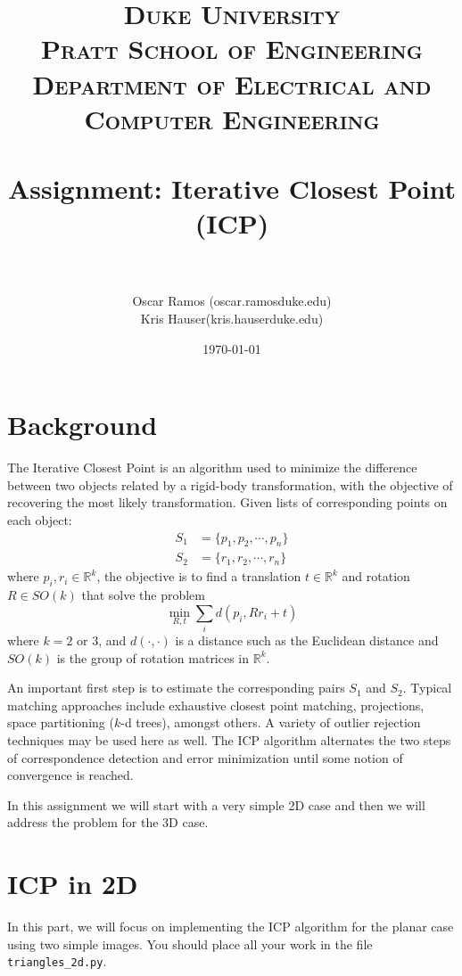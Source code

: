 \documentclass[a4paper,11pt]{article}
\title{	
  \normalfont \normalsize 
  \textsc{
    Duke University \\ 
    Pratt School of Engineering \\
    Department of Electrical and Computer Engineering} \\ [25pt]
  \horrule{0.5pt} \\[0.4cm]
  \huge Assignment: Iterative Closest Point (ICP) \\
  \horrule{2pt} \\[0.5cm]  
}
\author{Oscar Ramos (oscar.ramos\@ duke.edu)\\
Kris Hauser(kris.hauser\@ duke.edu) }
\date{\normalsize\today}
\begin{document}
\maketitle
\thispagestyle{empty}



\section{Background}

The Iterative Closest Point is an algorithm used to minimize the difference
between two objects related by a rigid-body transformation, with the objective
of recovering the most likely transformation. Given lists of corresponding points on 
each object:
\begin{align*}
  S_1 & = \{ p_1, p_2, \cdots, p_n \} \\
  S_2 & = \{ r_1, r_2, \cdots, r_n \}
\end{align*}
where $p_i,r_i \in \mathbb{R}^k$, the objective is to find a translation
$t \in \mathbb{R}^k$ and rotation $R \in SO(k)$ that solve the problem 
\begin{equation}
  \label{eq:general_minimization}
  \min_{R,t} \sum_{i} d(p_i, Rr_i+t)
\end{equation}
where $k=2$ or $3$, and $d(\cdot,\cdot)$ is a distance such as the Euclidean distance and $SO(k)$ is the
group of rotation matrices in $\mathbb{R}^k$. 

An important first step is to estimate the corresponding pairs $S_1$ and $S_2$. Typical
matching approaches include exhaustive closest point matching, projections,
space partitioning ($k$-d trees), amongst others.  A variety of outlier rejection
techniques may be used here as well.  The ICP algorithm alternates the two steps of
correspondence detection and error minimization until some notion of convergence is
reached.

In this assignment we will start
with a very simple 2D case and then we will address the problem for the 3D case.


\section{ICP in 2D}

In this part, we will focus on implementing the ICP algorithm for the planar
case using two simple images.  You should place all your work in the file
\texttt{triangles\_2d.py}.
\end{document}
